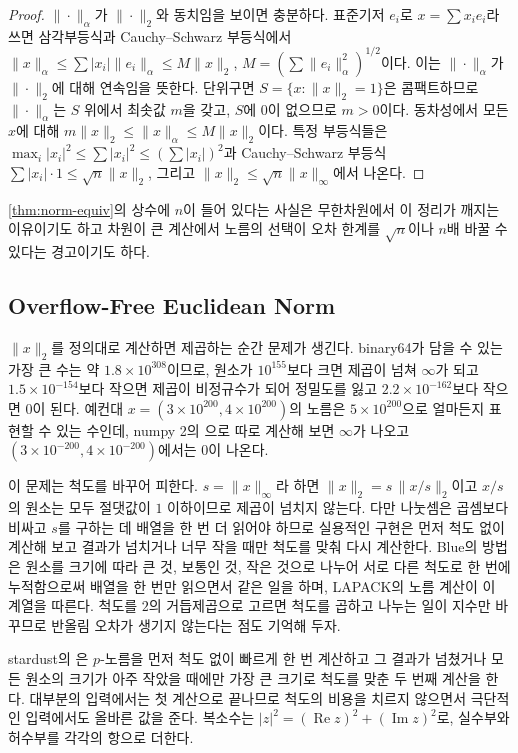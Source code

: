 \begin{proof}
$\|\cdot\|_\alpha$가 $\|\cdot\|_2$와 동치임을 보이면 충분하다. 표준기저 $e_i$로 $x=\sum x_ie_i$라 쓰면 삼각부등식과 Cauchy--Schwarz 부등식에서 $\|x\|_\alpha\le\sum|x_i|\|e_i\|_\alpha\le M\|x\|_2$, $M=(\sum\|e_i\|_\alpha^2)^{1/2}$이다. 이는 $\|\cdot\|_\alpha$가 $\|\cdot\|_2$에 대해 연속임을 뜻한다. 단위구면 $S=\{x:\|x\|_2=1\}$은 콤팩트하므로 $\|\cdot\|_\alpha$는 $S$ 위에서 최솟값 $m$을 갖고, $S$에 $0$이 없으므로 $m>0$이다. 동차성에서 모든 $x$에 대해 $m\|x\|_2\le\|x\|_\alpha\le M\|x\|_2$이다. 특정 부등식들은 $\max_i|x_i|^2\le\sum|x_i|^2\le(\sum|x_i|)^2$과 Cauchy--Schwarz 부등식 $\sum|x_i|\cdot1\le\sqrt n\|x\|_2$, 그리고 $\|x\|_2\le\sqrt n\|x\|_\infty$에서 나온다.
\end{proof}

\cref{thm:norm-equiv}의 상수에 $n$이 들어 있다는 사실은 무한차원에서 이 정리가 깨지는 이유이기도 하고 차원이 큰 계산에서 노름의 선택이 오차 한계를 $\sqrt n$이나 $n$배 바꿀 수 있다는 경고이기도 하다.

\subsection{Overflow-Free Euclidean Norm}

$\|x\|_2$를 정의대로 계산하면 제곱하는 순간 문제가 생긴다. binary64가 담을 수 있는 가장 큰 수는 약 $1.8\times10^{308}$이므로, 원소가 $10^{155}$보다 크면 제곱이 넘쳐 $\infty$가 되고 $1.5\times10^{-154}$보다 작으면 제곱이 비정규수가 되어 정밀도를 잃고 $2.2\times10^{-162}$보다 작으면 $0$이 된다. 예컨대 $x=(3\times10^{200},4\times10^{200})$의 노름은 $5\times10^{200}$으로 얼마든지 표현할 수 있는 수인데, numpy 2의 으로 따로 계산해 보면 $\infty$가 나오고 $(3\times10^{-200},4\times10^{-200})$에서는 $0$이 나온다.

이 문제는 척도를 바꾸어 피한다. $s=\|x\|_\infty$라 하면 $\|x\|_2=s\,\|x/s\|_2$이고 $x/s$의 원소는 모두 절댓값이 $1$ 이하이므로 제곱이 넘치지 않는다. 다만 나눗셈은 곱셈보다 비싸고 $s$를 구하는 데 배열을 한 번 더 읽어야 하므로 실용적인 구현은 먼저 척도 없이 계산해 보고 결과가 넘치거나 너무 작을 때만 척도를 맞춰 다시 계산한다. Blue의 방법\cite{blue1978}은 원소를 크기에 따라 큰 것, 보통인 것, 작은 것으로 나누어 서로 다른 척도로 한 번에 누적함으로써 배열을 한 번만 읽으면서 같은 일을 하며, LAPACK의 노름 계산이 이 계열을 따른다. 척도를 $2$의 거듭제곱으로 고르면 척도를 곱하고 나누는 일이 지수만 바꾸므로 반올림 오차가 생기지 않는다는 점도 기억해 두자.

\begin{instardust}
stardust의 은 $p$-노름을 먼저 척도 없이 빠르게 한 번 계산하고 그 결과가 넘쳤거나 모든 원소의 크기가 아주 작았을 때에만 가장 큰 크기로 척도를 맞춘 두 번째 계산을 한다. 대부분의 입력에서는 첫 계산으로 끝나므로 척도의 비용을 치르지 않으면서 극단적인 입력에서도 올바른 값을 준다. 복소수는 $|z|^2=(\operatorname{Re}z)^2+(\operatorname{Im}z)^2$로, 실수부와 허수부를 각각의 항으로 더한다.
\end{instardust}

